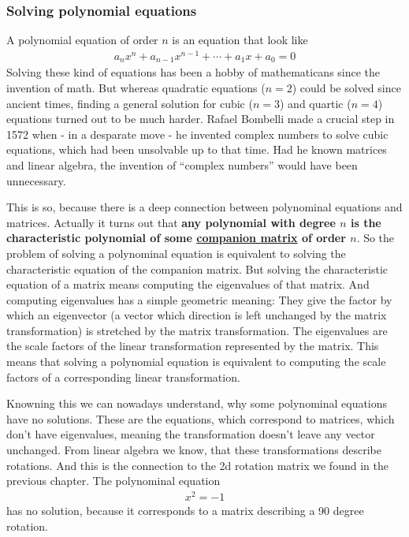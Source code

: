 \subsubsection{Solving polynomial equations}
A polynomial equation of order $n$ is an equation that look like 
\begin{align}
a_nx^n + a_{n-1}x^{n-1} + \cdots + a_1 x + a_0 = 0
\end{align} 
Solving these kind of equations has been a hobby of mathematicans
since the invention of math. But whereas quadratic equations ($n=2$)
could be solved since ancient times, finding a general solution for
cubic ($n=3$) and quartic ($n=4$) equations turned out to be much
harder. Rafael Bombelli made a crucial step in 1572 when - in a
desparate move - he invented complex numbers to solve cubic equations,
which had been unsolvable up to that time. Had he known matrices and
linear algebra, the invention of ``complex numbers'' would have been
unnecessary.

This is so, because there is a deep connection between polynominal
equations and matrices. Actually it turns out that \textbf{any
polynomial with degree $n$ is the characteristic polynomial of some
\href{https://en.wikipedia.org/wiki/Companion_matrix}{companion matrix}
of order $n$}. So the problem of solving a polynominal equation is
equivalent to solving the characteristic equation of the companion
matrix. But solving the characteristic equation of a matrix means
computing the eigenvalues of that matrix. And computing eigenvalues has
a simple geometric meaning: They give the factor by which an eigenvector
(a vector which direction is left unchanged by the matrix
transformation) is stretched by the matrix transformation. The
eigenvalues are the scale factors of the linear transformation
represented by the matrix. This means that solving a polynomial equation
is equivalent to computing the scale factors of a corresponding linear
transformation.

Knowning this we can nowadays understand, why some polynominal equations
have no solutions. These are the equations, which correspond to
matrices, which don't have eigenvalues, meaning the transformation
doesn't leave any vector unchanged. From linear algebra we know, that
these transformations describe rotations. And this is the connection to
the 2d rotation matrix we found in the previous chapter. The polynominal
equation 
\begin{align}
x^2 = -1
\end{align} 
has no solution, because it corresponds to a matrix describing a 90
degree rotation.

